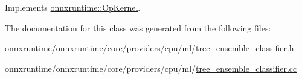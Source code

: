 Implements \mbox{\hyperlink{classonnxruntime_1_1OpKernel_a9eca8656a78b1b3ab9d3351a12798650}{onnxruntime\+::\+Op\+Kernel}}.



The documentation for this class was generated from the following files\+:\begin{DoxyCompactItemize}
\item 
onnxruntime/onnxruntime/core/providers/cpu/ml/\mbox{\hyperlink{tree__ensemble__classifier_8h}{tree\+\_\+ensemble\+\_\+classifier.\+h}}\item 
onnxruntime/onnxruntime/core/providers/cpu/ml/\mbox{\hyperlink{tree__ensemble__classifier_8cc}{tree\+\_\+ensemble\+\_\+classifier.\+cc}}\end{DoxyCompactItemize}
